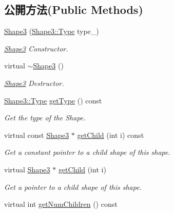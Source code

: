 \subsection*{公開方法(Public Methods)}
\begin{DoxyCompactItemize}
\item 
\hyperlink{class_i_dream_sky_1_1_shape3_aef288a7fbf23901161ddbd81f6d70191}{Shape3} (\hyperlink{class_i_dream_sky_1_1_shape3_afabf580a0794194e29eb14495ead7ae9}{Shape3\+::\+Type} type\+\_\+)
\begin{DoxyCompactList}\small\item\em \hyperlink{class_i_dream_sky_1_1_shape3}{Shape3} Constructor. \end{DoxyCompactList}\item 
virtual \hyperlink{class_i_dream_sky_1_1_shape3_a71ac6166c20d81d6f2c0e64c8ea4a524}{$\sim$\+Shape3} ()
\begin{DoxyCompactList}\small\item\em \hyperlink{class_i_dream_sky_1_1_shape3}{Shape3} Destructor. \end{DoxyCompactList}\item 
\hyperlink{class_i_dream_sky_1_1_shape3_afabf580a0794194e29eb14495ead7ae9}{Shape3\+::\+Type} \hyperlink{class_i_dream_sky_1_1_shape3_a5968a4ef166e399f5f0b7894666a94f2}{get\+Type} () const 
\begin{DoxyCompactList}\small\item\em Get the type of the Shape. \end{DoxyCompactList}\item 
virtual const \hyperlink{class_i_dream_sky_1_1_shape3}{Shape3} $\ast$ \hyperlink{class_i_dream_sky_1_1_shape3_ab751e951847254e02861cf8a3572e7bc}{get\+Child} (int i) const 
\begin{DoxyCompactList}\small\item\em Get a constant pointer to a child shape of this shape. \end{DoxyCompactList}\item 
virtual \hyperlink{class_i_dream_sky_1_1_shape3}{Shape3} $\ast$ \hyperlink{class_i_dream_sky_1_1_shape3_ae0b8c8c043c558486ecb24b4420cc71e}{get\+Child} (int i)
\begin{DoxyCompactList}\small\item\em Get a pointer to a child shape of this shape. \end{DoxyCompactList}\item 
virtual int \hyperlink{class_i_dream_sky_1_1_shape3_a9564c4fe471f1aca17f7419c4ef10ab6}{get\+Num\+Children} () const 

\end{DoxyCompactItemize}
